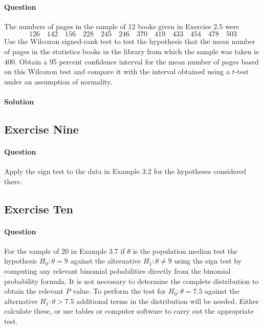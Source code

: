 \documentclass[]{article}
\let\oldparagraph\paragraph
\renewcommand{\paragraph}[1]{\oldparagraph{#1}\mbox{}}
\begin{document}
\paragraph{Question}\label{question-7}

The numbers of pages in the sample of 12 books given in Exercise 2.5
were
\[126\quad142\quad156\quad228\quad245\quad246\quad370\quad419\quad433\quad454\quad478\quad503\]
Use the Wilcoxon signed-rank test to test the hypothesis that the mean
number of pages in the statistics books in the library from which the
sample was taken is 400. Obtain a 95 percent confidence interval for the
mean number of pages based on this Wilcoxon test and compare it with the
interval obtained using a \(t\)-test under an assumption of normality.

\paragraph{Solution}\label{solution-7}

\subsection{Exercise Nine}\label{exercise-nine}

\paragraph{Question}\label{question-8}

Apply the sign test to the data in Example 3.2 for the hypotheses
considered there.

\subsection{Exercise Ten}\label{exercise-ten}

\paragraph{Question}\label{question-9}

For the sample of 20 in Example 3.7 if \(\theta\) is the population
median test the hypothesis \(H_0: \theta = 9\) against the alternative
\(H_1: \theta \neq 9\) using the sign test by computing any relevant
binomial pobabilities directly from the binomial probability formula. It
is not necessary to determine the complete distribution to obtain the
relevant \(P\) value. To perform the test for \(H_0: \theta = 7.5\)
against the alternative \(H_1: \theta > 7.5\) additional terms in the
distribution will be needed. Either calculate these, or use tables or
computer software to carry out the appropriate test.
\end{document}
